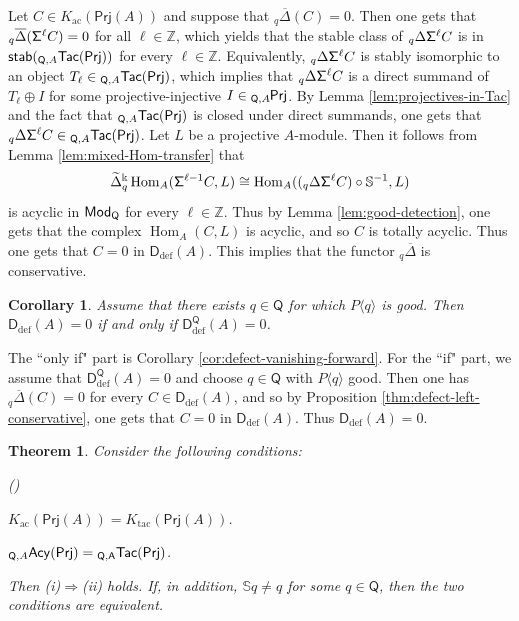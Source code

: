 \documentclass{amsart}
\theoremstyle{bfupright head,slanted body}
\theoremstyle{bfupright head,upright body}
\theoremstyle{fixed bf head,slanted body}
\newtheorem{thm}[res]{Theorem}          \newtheorem*{thm*}{Theorem}
\newtheorem{cor}[res]{Corollary}        \newtheorem*{cor*}{Corollary}
\theoremstyle{fixed bf head,upright body}
\theoremstyle{numbered paragraph}
\newlength{\thmlistleft}        %
\newlength{\thmlistright}       %
\newlength{\thmlistpartopsep}   %
\newlength{\thmlisttopsep}      %
\newlength{\thmlistparsep}      %
\newlength{\thmlistitemsep}     %
\newcounter{eqc}
\newenvironment{eqc}{\begin{list}{\upshape (\textit{\roman{eqc}})}%
		{\usecounter{eqc}%
			\setlength{\leftmargin}{\thmlistleft}%
			\setlength{\labelwidth}{\thmlistleft}%
			\setlength{\rightmargin}{\thmlistright}%
			\setlength{\partopsep}{\thmlistpartopsep}%
			\setlength{\topsep}{\thmlisttopsep}%
			\setlength{\parsep}{\thmlistparsep}%
			\setlength{\itemsep}{\thmlistitemsep}}}%
	{\end{list}}%
\newenvironment{prf*}[1][Proof]{%
	\begin{proof}[\bf #1]
		\setcounter{equation}{0}
		\renewcommand{\theequation}{\arabic{equation}}}
	{\end{proof}
}
\newcommand{\eqclbl}[1]{{\upshape(\textit{#1})}}
\numberwithin{equation}{res}
\newcommand{\TacQ}{{}_{\Q,A}\mathsf{Tac}(\sf Prj)}
\newcommand{\AcQ}{{}_{\Q,A}\mathsf{Acy}(\sf Prj)}
\newcommand{\Prj}[1]{\mathsf{Prj}(#1)}
\newcommand{\Hom}{\operatorname{Hom}}
\newcommand{\Q}{\mathsf{Q}}
\newcommand{\kk}{\Bbbk}
\newcommand{\lPrj}[1]{{}_{#1}\mspace{-1mu}{\sf{Prj}}}
\newcommand{\rMod}[1]{{\sf{Mod}}_{#1}}
\begin{document}
\begin{prf*}
Let $C\in K_{\mathrm{ac}}(\Prj A)$ and suppose that ${}_q\overline{\Delta}(C)=0$. Then one gets that ${}_q\overline{\Delta}({\sf\Sigma}^{\ell}C)=0$ for all $\ell\in\mathbb Z$, which yields that the stable class of ${}_q\Delta{\sf\Sigma}^{\ell}C$ is in $\mathsf{stab}(\TacQ)$ for every $\ell\in\mathbb Z$. Equivalently, ${}_q\Delta{\sf\Sigma}^{\ell}C$ is stably isomorphic to an object $T_\ell\in\TacQ$, which implies that ${}_q\Delta{\sf\Sigma}^{\ell}C$ is a direct summand of $T_\ell\oplus I$ for some projective-injective
$I\in\lPrj{\Q,A}$. By Lemma \ref{lem:projectives-in-Tac} and the fact that $\TacQ$ is closed under direct summands, one gets that ${}_q\Delta{\sf\Sigma}^{\ell}C\in\TacQ$. Let $L$ be a projective $A$-module. Then it follows from Lemma \ref{lem:mixed-Hom-transfer} that
$$\widetilde{\Delta}_q^{\kk}\Hom_A({\sf\Sigma}^{\ell-1}C,L)\cong \Hom_A(({}_q\Delta{\sf\Sigma}^{\ell}C)\circ\mathbb S^{-1},L)$$
is acyclic in $\rMod{\Q}$ for every $\ell\in\mathbb Z$. Thus by Lemma \ref{lem:good-detection}, one gets that the complex $\Hom_A(C,L)$ is acyclic, and so $C$ is totally acyclic. Thus one gets that $C=0$ in $\mathsf D_{\mathrm{def}}(A)$. This implies that the functor ${}_q\overline{\Delta}$ is conservative.
\end{prf*}

\begin{cor}\label{cor:defect-vanishing-equivalence}
Assume that there exists $q\in\Q$ for which $P\langle q\rangle$ is good. Then
$\mathsf D_{\mathrm{def}}(A)=0$ if and only if $\mathsf D_{\mathrm{def}}^{\Q}(A)=0$.
\end{cor}

\begin{prf*}
The ``only if" part is Corollary \ref{cor:defect-vanishing-forward}. For the ``if" part, we assume that $\mathsf D_{\mathrm{def}}^{\Q}(A)=0$ and choose $q\in\Q$ with $P\langle q\rangle$ good. Then one has
${}_q\overline{\Delta}(C)=0$ for every $C\in\mathsf D_{\mathrm{def}}(A)$, and so by
Proposition \ref{thm:defect-left-conservative}, one gets that $C=0$ in $\mathsf D_{\mathrm{def}}(A)$. Thus $\mathsf D_{\mathrm{def}}(A)=0$.
\end{prf*}

\begin{thm}\label{thm:classical-Q-defect-equivalence}
Consider the following conditions:
\begin{eqc}
\item $K_{\mathrm{ac}}(\Prj A)=K_{\mathrm{tac}}(\Prj A)$.
\item $\AcQ=\TacQ$.
\end{eqc}
Then \eqclbl{i}$\Longrightarrow$\eqclbl{ii} holds. If, in addition, $\mathbb S q\neq q$ for some $q\in\Q$, then the two conditions are equivalent.
\end{thm}
\end{document}
